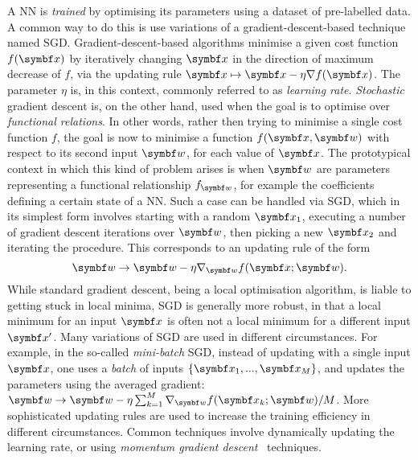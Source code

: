 A \ac{NN} is \emph{trained} by optimising its parameters using a dataset of pre-labelled data.
A common  way to do this is use variations of a gradient-descent-based technique named \acf{SGD}.
Gradient-descent-based algorithms minimise a given cost function $f(\bs x)$ by iteratively changing $\bs x$ in the direction of maximum decrease of $f$, via the updating rule $\bs x\mapsto\bs x-\eta\grad f(\bs x)$.
The parameter $\eta$ is, in this context, commonly referred to as \emph{learning rate}.
\emph{Stochastic} gradient descent is, on the other hand, used when the goal is to optimise over \emph{functional relations}. In other words, rather then trying to minimise a single cost function $f$, the goal is now to minimise a function $f(\bsx,\bs w)$ with respect to its second input $\bs w$, for each value of $\bs x$.
The prototypical context in which this kind of problem arises is when $\bs w$ are parameters representing a functional relationship $f_{\bs w}$, for example the coefficients defining a certain state of a \ac{NN}.
Such a case can be handled via \ac{SGD}, which in its simplest form involves starting with a random $\bs x_1$, executing a number of gradient descent iterations over $\bs w$, then picking a new $\bs x_2$ and iterating the procedure.
This corresponds to an updating rule of the form
\begin{equation}
	\bs w \to \bs w - \eta\grad_{\bs w}f(\bs x;\bs w).
	\label{eq:GL:updating_rule}
\end{equation}
While standard gradient descent, being a local optimisation algorithm, is liable to getting stuck in local minima, \ac{SGD} is generally more robust, in that a local minimum for an input $\bs x$ is often not a local minimum for a different input $\bs x'$.
Many variations of \ac{SGD} are used in different circumstances.
For example, in the so-called \emph{mini-batch} \ac{SGD}, instead of updating with a single input $\bs x$, one uses a \emph{batch} of inputs $\{\bs x_1,...,\bs x_M\}$, and updates the parameters using the averaged gradient:
$\bs w\to\bs w-\eta\sum_{k=1}^M\grad_{\bs w}f(\bs x_k; \bs w)/M$.
More sophisticated updating rules are used to increase the training efficiency in different circumstances.
Common techniques involve dynamically updating the learning rate, or using \emph{momentum gradient descent}~\cite{goh2017momentum,ruder2016overview} techniques.

